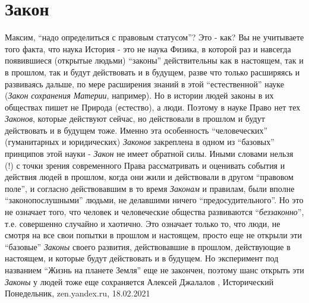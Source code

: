  
 
 
 
 
\chapter{Закон}
\label{sec:slova.zakon}

Максим, \enquote{надо определиться с правовым статусом}? Это - как? Вы не
учитываете того факта, что наука История - это не наука Физика, в которой раз и
навсегда появившиеся (открытые людьми) \enquote{законы} действительны как в
настоящем, так и в прошлом, так и будут действовать и в будущем, разве что
только расширяясь и развиваясь дальше, по мере расширения знаний в этой
\enquote{естественной} науке (\emph{Закон сохранения Материи}, например). Но в
истории людей законы в их обществах пишет не Природа (естество), а люди.
Поэтому в науке Право нет тех \emph{Законов}, которые действуют сейчас, но действовали
в прошлом и будут действовать и в будущем тоже. Именно эта особенность
\enquote{человеческих} (гуманитарных и юридических) \emph{Законов} закреплена в
одном из \enquote{базовых} принципов этой науки - \emph{Закон} не имеет обратной силы.
Иными словами нельзя (!) с точки зрения современного Права рассматривать и
оценивать события и действия людей в прошлом, когда они жили и действовали в
другом \enquote{правовом поле}, и согласно действовавшим в то время \emph{Законам} и
правилам, были вполне \enquote{законопослушными} людьми, не делавшими ничего
\enquote{предосудительного}.  Но это не означает того, что человек и
человеческие общества развиваются \enquote{\emph{беззаконно}}, т.е. совершенно
случайно и хаотично. Это означает только то, что люди, не смотря на все свои
попытки в прошлом и настоящем, просто еще не открыли эти \enquote{базовые}
\emph{Законы} своего развития, действовавшие в прошлом, действующие в
настоящем, и которые будут действовать и в будущем. Но эксперимент под
названием \enquote{Жизнь на планете Земля} еще не закончен, поэтому шанс
открыть эти \emph{Законы} у людей тоже еще сохраняется
Алексей Джалалов
, 
Исторический Понедельник, zen.yandex.ru, 18.02.2021

